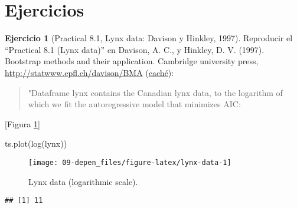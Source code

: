 \documentclass[
]{book}
\newenvironment{Shaded}{\begin{snugshade}}{\end{snugshade}}
\newcommand{\FunctionTok}[1]{\textcolor[rgb]{0.00,0.00,0.00}{#1}}
\newcommand{\NormalTok}[1]{#1}
\newcommand{\OtherTok}[1]{\textcolor[rgb]{0.56,0.35,0.01}{#1}}
\newcommand{\SpecialCharTok}[1]{\textcolor[rgb]{0.00,0.00,0.00}{#1}}
\theoremstyle{break}
\theoremstyle{definition}
\theoremstyle{definition}
\theoremstyle{definition}
\newtheorem{exercise}{Ejercicio}[chapter]
\theoremstyle{definition}
\theoremstyle{remark}
\begin{document}
\hypertarget{ejercicios-1}{%
\section{Ejercicios}\label{ejercicios-1}}

\begin{exercise}[Practical 8.1, Lynx data: Davison y Hinkley, 1997]
\protect\hypertarget{exr:tsboot-lynx}{}{\label{exr:tsboot-lynx} \iffalse (Practical 8.1, Lynx data: Davison y Hinkley, 1997) \fi{} }
Reproducir el ``Practical 8.1 (Lynx data)'' en Davison, A. C., y Hinkley, D. V. (1997). Bootstrap methods and their application. Cambridge university press, \url{http://statwww.epfl.ch/davison/BMA}
(\href{http://webcache.googleusercontent.com/search?q=cache:a4nFL5ymMMoJ:statwww.epfl.ch/davison/BMA/+\&cd=1\&hl=gl\&ct=clnk\&gl=es}{caché}):
\end{exercise}

\begin{quote}
"Dataframe lynx contains the Canadian lynx data,
to the logarithm of which we fit the autoregressive
model that minimizes AIC:
\end{quote}

{[}Figura \ref{fig:lynx-data}{]}

\begin{Shaded}
\begin{Highlighting}[]
\FunctionTok{ts.plot}\NormalTok{(}\FunctionTok{log}\NormalTok{(lynx))}
\end{Highlighting}
\end{Shaded}

\begin{figure}[!htb]

{\centering \texttt{[image: 09-depen\_files/figure-latex/lynx-data-1]} 

}

\caption{Lynx data (logarithmic scale).}\label{fig:lynx-data}
\end{figure}

\begin{Shaded}
\end{Shaded}

\begin{verbatim}
## [1] 11
\end{verbatim}
\end{document}

